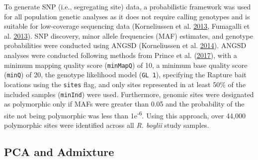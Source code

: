 \documentclass[proquest,12pt,final]{ucthesis-CA2012} %
\begin{document}
\begin{ucmainmatter}
To generate SNP (i.e., segregating site) data, a probabilistic framework
was used for all population genetic analyses as it does not require
calling genotypes and is suitable for low-coverage sequencing data
(Korneliussen et al.
\protect\hyperlink{ref-korneliussen_calculation_2013}{2013}, Fumagalli
et al. \protect\hyperlink{ref-fumagalli_quantifying_2013}{2013}). SNP
discovery, minor allele frequencies (MAF) estimates, and genotype
probabilities were conducted using ANGSD (Korneliussen et al.
\protect\hyperlink{ref-korneliussen_angsd_2014}{2014}). ANGSD analyses
were conducted following methods from Prince et al.
(\protect\hyperlink{ref-prince_evolutionary_2017}{2017}), with a minimum
mapping quality score (\texttt{minMapQ}) of 10, a minimum base quality
score (\texttt{minQ}) of 20, the genotype likelihood model
(\texttt{GL\ 1}), specifying the Rapture bait locations using the
\texttt{sites} flag, and only sites represented in at least 50\% of the
included samples (\texttt{minInd}) were used. Furthermore, genomic sites
were designated as polymorphic only if MAFs were greater than 0.05 and
the probability of the site not being polymorphic was less than
1e\textsuperscript{-6}. Using this approach, over 44,000 polymorphic
sites were identified across all \emph{R. boylii} study samples.

\hypertarget{pca-and-admixture}{%
\subsection{PCA and Admixture}\label{pca-and-admixture}}


\end{ucmainmatter}
\end{document}
